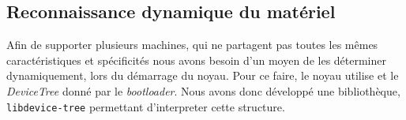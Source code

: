 \documentclass[french, 12pt]{article}
\begin{document}

%

\subsection{Reconnaissance dynamique du matériel}
Afin de supporter plusieurs machines, qui ne partagent pas toutes les mêmes
caractéristiques et spécificités nous avons besoin d'un moyen de les déterminer
dynamiquement, lors du démarrage du noyau. Pour ce faire, le noyau utilise et le
\textit{DeviceTree} donné par le \textit{bootloader}. Nous avons donc développé
une bibliothèque, \mbox{\texttt{libdevice-tree}} permettant d'interpreter cette
structure.
\end{document}
